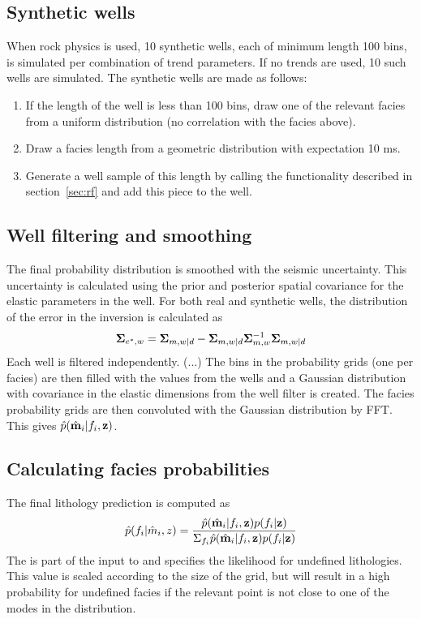 \subsection{Synthetic wells}
When rock physics is used, 10 synthetic wells, each of minimum length 100 bins, is simulated per combination of trend parameters. If no trends are used, 10 such wells are simulated. The synthetic wells are made as follows:
\begin{enumerate}
\item If the length of the well is less than 100 bins, draw one of the relevant facies from a uniform distribution (no correlation with the facies above).
\item Draw a facies length from a geometric distribution with expectation 10 ms.
\item Generate a well sample of this length by calling the functionality described in section~\ref{sec:rf} and add this piece to the well.
\end{enumerate}

\subsection{Well filtering and smoothing}
The final probability distribution is smoothed with the seismic uncertainty. This uncertainty is calculated using the prior and posterior spatial covariance for the elastic parameters in the well. For both real and synthetic wells, the distribution of the error in the inversion is calculated as
\label{eq:}
\begin{equation}
\mathbf{\Sigma}_{e^*,w} = \mathbf{\Sigma}_{m,w|d} - \mathbf{\Sigma}_{m,w|d} \mathbf{\Sigma}_{m,w}^{-1} \mathbf{\Sigma}_{m,w|d}
\end{equation}
Each well is filtered independently. (...) The bins in the probability grids (one per facies) are then filled with the values from the wells and a Gaussian distribution with covariance in the elastic dimensions from the well filter is created. The facies probability grids are then convoluted with the Gaussian distribution by FFT. This gives $ \hat{p}(\hat{\mathbf{m}}_i|f_i,\mathbf{z}) $.
\subsection{Calculating facies probabilities}
The final lithology prediction is computed as
\begin{equation}
\hat{p}(f_i|\hat{m}_i,z) = \frac{\hat{p}(\hat{\mathbf{m}}_i|f_i,\mathbf{z}) p(f_i|\mathbf{z})}{\Sigma_{f_i} \hat{p}(\hat{\mathbf{m}}_i|f_i,\mathbf{z}) p(f_i|\mathbf{z})}
\end{equation} 
The  is part of the input to \crava and specifies the likelihood for undefined lithologies. This value is scaled according to the size of the grid, but will result in a high probability for undefined facies if the relevant point is not close to one of the modes in the distribution.